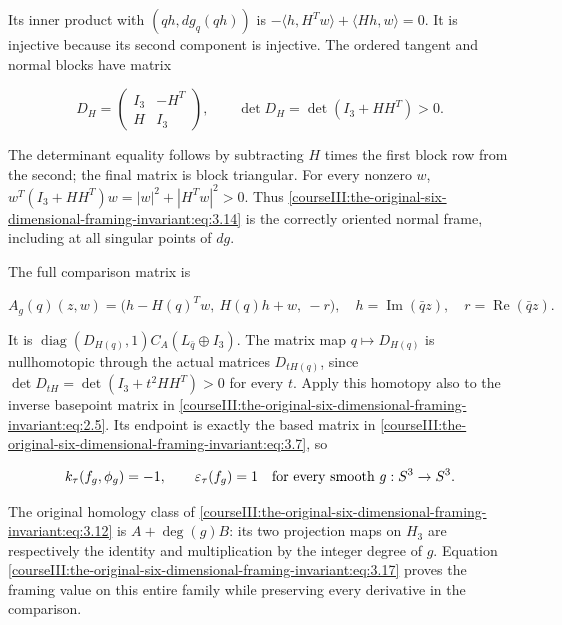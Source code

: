 Its inner product with \((qh,dg_q(qh))\) is
\(-\langle h,H^Tw\rangle+\langle Hh,w\rangle=0\).
It is injective because its second component is injective. The ordered tangent and normal blocks have matrix

\begin{equation}
D_H=
 \begin{pmatrix}I_3&-H^T\\H&I_3\end{pmatrix},
 \qquad
 \det D_H=\det(I_3+HH^T)>0.
 \label{courseIII:the-original-six-dimensional-framing-invariant:eq:3.15}
\end{equation}

The determinant equality follows by subtracting \(H\) times the first block row from the second; the final matrix is block triangular. For every nonzero \(w\),
\(w^T(I_3+HH^T)w=|w|^2+|H^Tw|^2>0\).
Thus \eqref{courseIII:the-original-six-dimensional-framing-invariant:eq:3.14} is the correctly oriented normal frame, including at all singular points of \(dg\).

The full comparison matrix is

\begin{equation}
A_g(q)(z,w)=
 \bigl(h-H(q)^Tw,\ H(q)h+w,\ -r\bigr),
 \quad h=\operatorname{Im}(\bar qz),\quad
 r=\operatorname{Re}(\bar qz).
 \label{courseIII:the-original-six-dimensional-framing-invariant:eq:3.16}
\end{equation}

It is \(\operatorname{diag}(D_{H(q)},1)C_A(L_{\bar q}\oplus I_3)\).
The matrix map \(q\mapsto D_{H(q)}\) is nullhomotopic through the actual matrices \(D_{tH(q)}\), since
\(\det D_{tH}=\det(I_3+t^2HH^T)>0\)
for every \(t\). Apply this homotopy also to the inverse basepoint matrix in \eqref{courseIII:the-original-six-dimensional-framing-invariant:eq:2.5}. Its endpoint is exactly the based matrix in \eqref{courseIII:the-original-six-dimensional-framing-invariant:eq:3.7}, so

\begin{equation}
k_\tau(f_g,\phi_g)=-1,\qquad\varepsilon_\tau(f_g)=1
       \quad\hbox{for every smooth }g:S^3\to S^3.
 \label{courseIII:the-original-six-dimensional-framing-invariant:eq:3.17}
\end{equation}

The original homology class of \eqref{courseIII:the-original-six-dimensional-framing-invariant:eq:3.12} is \(A+\deg(g)B\): its two projection maps on \(H_3\) are respectively the identity and multiplication by the integer degree of \(g\). Equation \eqref{courseIII:the-original-six-dimensional-framing-invariant:eq:3.17} proves the framing value on this entire family while preserving every derivative in the comparison.

